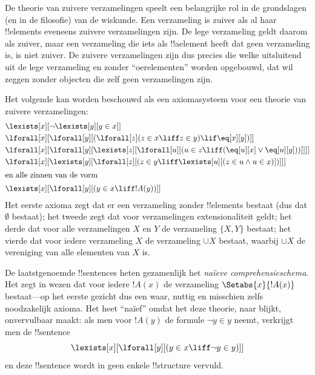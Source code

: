 \documentclass[../../../include/open-logic-section]{subfiles}
\begin{document}
\begin{ex}
De theorie van zuivere verzamelingen speelt een belangrijke rol in de
grondslagen (en in de filosofie) van de wiskunde. Een verzameling is
zuiver als al haar !!{element}s eveneens zuivere verzamelingen zijn.
De lege verzameling geldt daarom als zuiver, maar een verzameling die
iets als !!a{element} heeft dat geen verzameling is, is niet zuiver.
De zuivere verzamelingen zijn dus precies die welke uitsluitend uit de
lege verzameling en zonder ``oerelementen'' worden opgebouwd, dat wil
zeggen zonder objecten die zelf geen verzamelingen zijn.

Het volgende kan worden beschouwd als een axiomasysteem voor een
theorie van zuivere verzamelingen:
\begin{align*}
& \lexists[x][\lnot \lexists[y][y \in x]]\\
& \lforall[x][\lforall[y][(\lforall[z](z \in x \liff z \in y) \lif 
\eq[x][y])]]\\
& \lforall[x][\lforall[y][\lexists[z][\lforall[u][(u \in z \liff
(\eq[u][x] \lor \eq[u][y]))]]]]\\
& \lforall[x][\lexists[y][\lforall[z][(z \in y \liff \lexists[u][(z \in
        u \land u \in x)])]]]\\
\intertext{en alle zinnen van de vorm} &
\lexists[x][\lforall[y][(y \in x \liff !A(y))]]
\end{align*}
Het eerste axioma zegt dat er een verzameling zonder !!{element}s
bestaat (dus dat $\emptyset$ bestaat); het tweede zegt dat voor
verzamelingen extensionaliteit geldt; het derde dat voor alle
verzamelingen $X$ en $Y$ de verzameling $\{X, Y\}$ bestaat; het vierde
dat voor iedere verzameling $X$ de verzameling $\cup X$ bestaat,
waarbij $\cup X$ de vereniging van alle elementen van $X$ is.

De laatstgenoemde !!{sentence}s heten gezamenlijk het
\emph{naïeve comprehensieschema}. Het zegt in wezen dat voor iedere
$!A(x)$ de verzameling $\Setabs{x}{!A(x)}$ bestaat---op het eerste
gezicht dus een waar, nuttig en misschien zelfs noodzakelijk axioma.
Het heet ``naïef'' omdat het deze theorie, naar blijkt, onvervulbaar
maakt: als men voor $!A(y)$ de formule $\lnot y \in y$ neemt, verkrijgt
men de !!{sentence}
\[
\lexists[x][\lforall[y][(y \in x \liff \lnot y \in y)]]
\]
en deze !!{sentence} wordt in geen enkele !!{structure} vervuld.
\end{ex}
\end{document}
